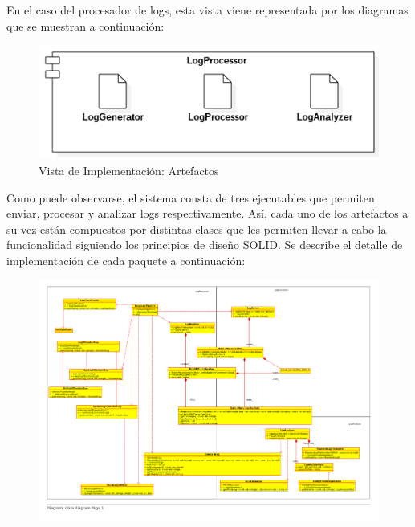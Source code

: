 \documentclass[11pt]{article}
\begin{document}
En el caso del procesador de logs, esta vista viene representada por los diagramas que se muestran a continuación:

\begin{center}
 \begin{figure}[H]
 \begin{center}
   \includegraphics[width=15cm]{img/implementation_view00.png}
   \caption{Vista de Implementación: Artefactos}
   \label{fig:4plus1views}
 \end{center}
 \end{figure}
\end{center}

Como puede observarse, el sistema consta de tres ejecutables que permiten enviar, procesar y analizar logs respectivamente. Así, cada uno de los artefactos a su vez están compuestos por distintas clases que les permiten llevar a cabo la funcionalidad siguiendo los principios de diseño SOLID. Se describe el detalle de implementación de cada paquete a continuación:

\begin{landscape}
\begin{center}
 \begin{figure}[H]
 \begin{center}
\includegraphics[scale=0.85]{classes01.pdf}
   \label{fig:classes_per_component}
 \end{center}
 \end{figure}
\end{center}
\end{landscape}
\restoregeometry
\end{document}
